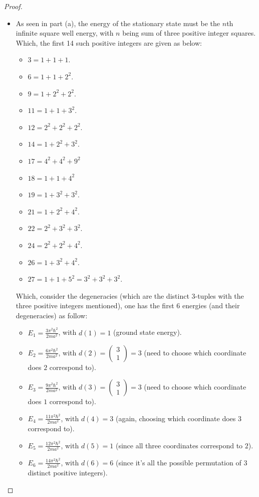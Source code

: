 \documentclass{article}
\begin{document}
\begin{proof}
\begin{itemize}
    \hfil

    \item[(b)] As seen in part (a), the energy of the stationary state must be the $n$th infinite square well energy, with $n$ being sum of three positive integer squares. Which, the first 14 such positive integers are given as below:
    \begin{itemize}
        \item $3=1+1+1$.
        \item $6=1+1+2^2$.
        \item $9 = 1+2^2+2^2$.
        \item $11 = 1+1+3^2$.
        \item $12 = 2^2+2^2+2^2$.
        \item $14 = 1+2^2+3^2$.
        \item $17 = 4^2+4^2+9^2$
        \item $18 = 1+1+4^2$
        \item $19 = 1+3^2+3^2$.
        \item $21 = 1+2^2+4^2$.
        \item $22 = 2^2+3^2+3^2$.
        \item $24 = 2^2+2^2+4^2$.
        \item $26 = 1+3^2+4^2$.
        \item $27 = 1+1+5^2 = 3^2+3^2+3^2$.
    \end{itemize}
    Which, consider the degeneracies (which are the distinct $3$-tuples with the three positive integers mentioned), one has the first 6 energies (and their degeneracies) as follow:
    \begin{itemize}
        \item $E_1 = \frac{3\pi^2\hbar^2}{2ma^2}$, with $d(1) = 1$ (ground state energy).
        \item $E_2 = \frac{6\pi^2\hbar^2}{2ma^2}$, with $d(2) = \begin{pmatrix}
            3\\1
        \end{pmatrix} = 3$ (need to choose which coordinate does $2$ correspond to).
        \item $E_3 = \frac{9\pi^2\hbar^2}{2ma^2}$, with $d(3) = \begin{pmatrix}
            3\\1
        \end{pmatrix} = 3$ (need to choose which coordinate does $1$ correspond to).
        \item $E_4 = \frac{11\pi^2\hbar^2}{2ma^2}$, with $d(4) = 3$ (again, choosing which coordinate does $3$ correspond to).
        \item $E_5 = \frac{12\pi^2\hbar^2}{2ma^2}$, with $d(5)=1$ (since all three coordinates correspond to $2$).
        \item $E_6 = \frac{14\pi^2\hbar^2}{2ma^2}$, with $d(6) = 6$ (since it's all the possible permutation of $3$ distinct positive integers).
    \end{itemize}


\end{itemize}
\end{proof}
\end{document}
